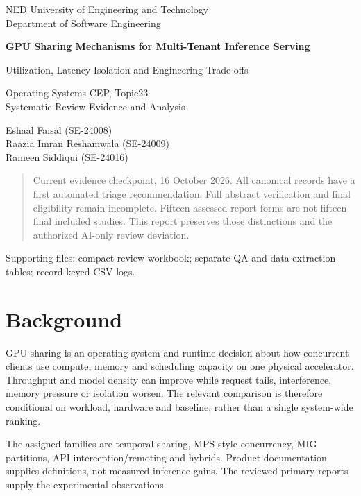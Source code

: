 \documentclass[12pt,a4paper]{article}
\begin{document}
\begin{titlepage}\centering
{\large NED University of Engineering and Technology\\Department of Software Engineering\par}\vspace{1.0cm}
{\LARGE\bfseries GPU Sharing Mechanisms for Multi-Tenant Inference Serving\par}\vspace{0.5cm}
{\Large Utilization, Latency Isolation and Engineering Trade-offs\par}\vspace{0.5cm}
{\large Operating Systems CEP, Topic23\\Systematic Review Evidence and Analysis\par}\vspace{0.7cm}
Eshaal Faisal (SE-24008)\\Raazia Imran Reshamwala (SE-24009)\\Rameen Siddiqui (SE-24016)
\vspace{0.8cm}\begin{quote}Current evidence checkpoint, 16 October 2026. All canonical records have a first automated triage recommendation. Full abstract verification and final eligibility remain incomplete. Fifteen assessed report forms are not fifteen final included studies. This report preserves those distinctions and the authorized AI-only review deviation.\end{quote}\vfill
Supporting files: compact review workbook; separate QA and data-extraction tables; record-keyed CSV logs.\end{titlepage}
\tableofcontents\clearpage


\section{Background}

GPU sharing is an operating-system and runtime decision about how concurrent clients use compute, memory and scheduling capacity on one physical accelerator. Throughput and model density can improve while request tails, interference, memory pressure or isolation worsen. The relevant comparison is therefore conditional on workload, hardware and baseline, rather than a single system-wide ranking.


The assigned families are temporal sharing, MPS-style concurrency, MIG partitions, API interception/\allowbreak{}remoting and hybrids. Product documentation supplies definitions, not measured inference gains. The reviewed primary reports supply the experimental observations.
\end{document}
